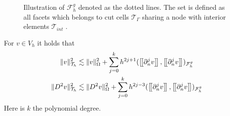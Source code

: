 \begin{figure}

\caption{Illustration of $\mathcal{F} _{h}^{g}$ denoted as the dotted lines. The set is defined as all facets which belongs to cut cells $\mathcal{T} _{\Gamma }$ sharing a node with interior elements $\mathcal{T} _{int }$ .  }
\label{fig:illustration_F_g}
\end{figure}





\begin{lemma}
    \label{lemma:bi_inv_gh_lemma}
    For $v \in  V_{h}$ it holds that
        \begin{align}
            \label{eq:bi_inv_gh_1}
        \| v \|_{ \mathcal{T} _{h} }^{ 2 }  & \lesssim  \| v \|_{ \Omega  }^{ 2 }  + \sum_{j=0}^{k} h^{2j+1} ( \jump{ \partial ^{j}_{n} v }, \jump{ \partial ^{j}_{n} v}    )_{\mathcal{F}_{h}^{g}}\\
            \label{eq:bi_inv_gh_2}
        \| D ^2 v \|_{ \mathcal{T} _{h} }^{ 2 }  & \lesssim  \| D^2 v \|_{ \Omega  }^{ 2 }  + \sum_{j=0}^{k} h^{2j-3} ( \jump{ \partial ^{j}_{n} v }, \jump{ \partial ^{j}_{n}v }    )_{\mathcal{F}_{h}^{g}}
        \end{align}
        Here is $k$ the polynomial degree.
\end{lemma}

